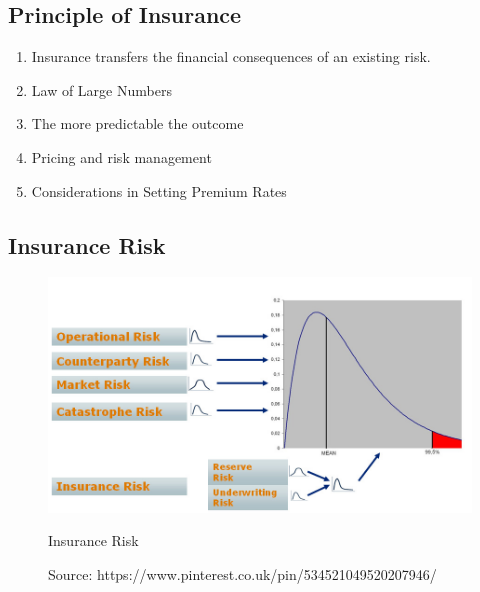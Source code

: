 \subsection{Principle of Insurance}
\begin{enumerate}
\item Insurance transfers the financial consequences of an existing risk.
\item Law of Large Numbers
\item The more predictable the outcome
\item Pricing and risk management
\item Considerations in Setting Premium Rates
\end{enumerate}

\newpage
\subsection{Insurance Risk}

\begin{figure}[tbh] %
\begin{center}
	\includegraphics[width = 5in]{images/ir.png}
	\caption{Insurance Risk} %
	\caption*{Source: https://www.pinterest.co.uk/pin/534521049520207946/}

	\label{Risk type}%
\end{center}
\end{figure}

